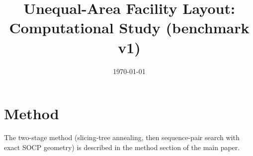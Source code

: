 \documentclass[11pt,a4paper]{article}
\title{Unequal-Area Facility Layout: Computational Study (benchmark v1)}
\author{}
\date{\today}
\begin{document}
\maketitle

\section{Method}
\label{sec:method}
The two-stage method (slicing-tree annealing, then sequence-pair search with exact SOCP geometry) is described
in the method section of the main paper.





\end{document}
